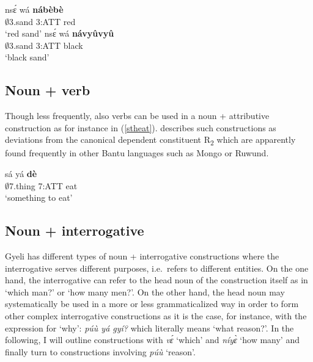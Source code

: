\begin{exe}
\ex\label{propcolors}
\begin{xlist}
\ex\label{propcolors1}
 \gll  nsɛ́ wá {\bfseries nábèbè} \\
          $\emptyset$3.sand 3:ATT red  \\
    \trans `red sand'
\ex \label{propcolors2}
  \gll    nsɛ́ wá {\bfseries návyûvyû} \\
              $\emptyset$3.sand 3:ATT black \\
    \trans `black sand'
\end {xlist}
\end {exe}


\subsection{Noun + verb}
\label{sec:NV}

Though less frequently, also verbs can be used in a noun + attributive construction as for instance in (\ref{stheat}). \citet[224]{velde2013} describes such constructions as deviations from the canonical dependent constituent R\textsubscript{2} which are apparently found frequently in other Bantu languages such as Mongo or Ruwund.

\begin{exe}
\ex\label{stheat} 
  \gll  sá yá {\bfseries dè} \\
           $\emptyset$7.thing 7:ATT eat \\
    \trans `something to eat'
\end {exe}



\subsection{Noun + interrogative}
\label{sec:NIntPro}

Gyeli has different types of noun + interrogative constructions where the interrogative serves different purposes, i.e.~refers to different entities. On the one hand, the interrogative can refer to the head noun of the construction itself as in `which man?' or   `how many men?'. On the other hand, the head noun may systematically be used in a more or less grammaticalized way in order to form other complex interrogative constructions as it is the case, for instance, with the expression for `why': {\itshape púù yá gyí?} which literally means `what reason?'. In the following, I will outline constructions with {\itshape vɛ́} `which' and {\itshape níyɛ̀} `how many' and finally turn to constructions involving {\itshape púù} `reason'.


